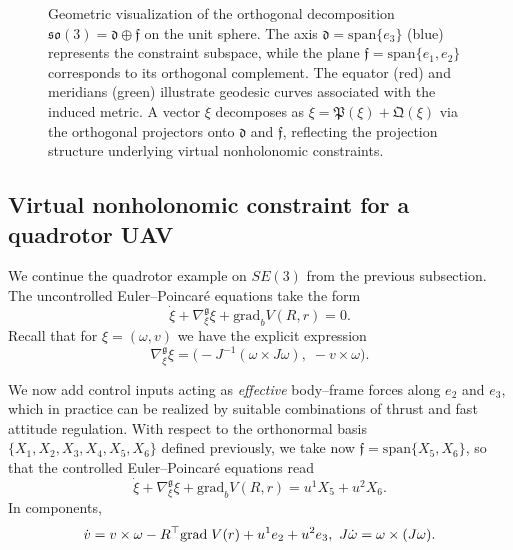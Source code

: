 \documentclass[letterpaper, 10 pt, conference]{ieeeconf}
\newcommand{\grad}{\normalfont{\text{grad}}}
\begin{document}
\begin{figure}[h!]

\caption{
Geometric visualization of the orthogonal decomposition 
$\mathfrak{so}(3) = \mathfrak d \oplus \mathfrak f$ on the unit sphere.
The axis $\mathfrak d = \mathrm{span}\{e_3\}$ (blue) represents the constraint 
subspace, while the plane $\mathfrak f = \mathrm{span}\{e_1,e_2\}$ corresponds to 
its orthogonal complement.
The equator (red) and meridians (green) illustrate geodesic curves associated 
with the induced metric.
A vector $\xi$ decomposes as $\xi = \mathfrak P(\xi) + \mathfrak Q(\xi)$ via the 
orthogonal projectors onto $\mathfrak d$ and $\mathfrak f$, reflecting the 
projection structure underlying virtual nonholonomic constraints.}

\label{fig:cartan-geodesic}
\end{figure}

\subsection{Virtual nonholonomic constraint for a quadrotor UAV}

We continue the quadrotor example on $SE(3)$
from the previous subsection. The uncontrolled
Euler--Poincar\'e equations take the form
\[
\dot\xi+\nabla^{\mathfrak g}_{\xi}\xi 
+ \text{grad}_{b} V(R,r)= 0.
\]
Recall that for $\xi=(\omega,v)$ we have the explicit expression
\[
\nabla^{\mathfrak g}_\xi\xi
=\big(-J^{-1}(\omega\times J\omega),\; -v\times\omega\big).
\]

We now add control inputs acting as \emph{effective} body--frame forces
along $e_2$ and $e_3$, which in practice can be realized by suitable
combinations of thrust and fast attitude regulation.  With respect to the
orthonormal basis $\{X_{1},X_{2},X_{3},X_{4},X_{5},X_{6}\}$ defined previously, we take now $\mathfrak f = \text{span} \{X_5,X_6\}$, so that the controlled Euler--Poincar\'e equations read
\begin{equation}\label{eq:se3-quad-controlled-nh}
\dot\xi+\nabla^{\mathfrak g}_{\xi}\xi
+ \text{grad}_{b} V(R,r)
= u^1X_5+u^2X_6.
\end{equation}
In components,
\[
\dot v = v\times\omega - R^{\top}\grad \; V(r) + u^1 e_2 + u^2 e_3,
\,\,
J\dot\omega = \omega\times (J\omega).
\]
\end{document}
